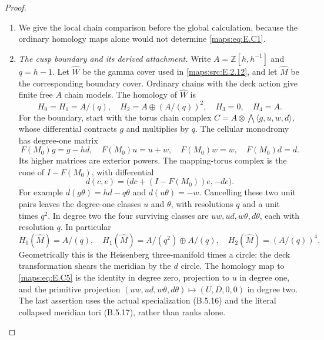 \begin{proof}
\begin{enumerate}[label=\arabic*.,leftmargin=*]
\item We give the local chain comparison before the global
calculation, because the ordinary homology maps alone would
not determine \eqref{maps:eq:E.C1}.

\item \emph{The cusp boundary and its derived attachment.}
Write $A=\mathbb Z[h,h^{-1}]$ and $q=h-1$. Let
$\widehat W$ be the gamma cover used in \ref{maps:src:E.2.12}, and let
$\widehat M$ be the corresponding boundary cover. Ordinary
chains with the deck action give finite free $A$ chain
models. The homology of $\widehat W$ is
\[
 H_0=H_1=A/(q),\quad H_2=A\oplus(A/(q))^2,
 \quad H_3=0,\quad H_4=A.
 \tag{E.C5}\label{maps:eq:E.C5}
\]
For the boundary, start with the torus chain complex
$C= A\otimes\bigwedge\langle g,u,w,d\rangle$,
whose differential contracts $g$ and multiplies by $q$.
The cellular monodromy has degree-one matrix
\[
 F(M_0)g=g-hd,\quad F(M_0)u=u+w,
 \quad F(M_0)w=w,\quad F(M_0)d=d.
 \tag{E.C6}\label{maps:eq:E.C6}
\]
Its higher matrices are exterior powers. The mapping-torus
complex is the cone of $I-F(M_0)$, with differential
\[
 d(c,e)=\big(dc+(I-F(M_0))e,-de\big).
 \tag{E.C7}\label{maps:eq:E.C7}
\]
For example $d(g\theta)=hd-q\theta$ and
$d(u\theta)=-w$. Cancelling these two unit pairs leaves
the degree-one classes $u$ and $\theta$, with resolutions
$q$ and a unit times $q^2$. In degree two the four surviving
classes are $uw,ud,w\theta,d\theta$, each with resolution
$q$. In particular
\[
 H_0(\widehat M)=A/(q),\quad
 H_1(\widehat M)=A/(q^2)\oplus A/(q),\quad
 H_2(\widehat M)=(A/(q))^4.
 \tag{E.C8}\label{maps:eq:E.C8}
\]
Geometrically this is the Heisenberg three-manifold times
a circle: the deck transformation shears the meridian
by the $d$ circle. The homology map to \eqref{maps:eq:E.C5} is the
identity in degree zero, projection to $u$ in degree one,
and the primitive projection
$(uw,ud,w\theta,d\theta)\mapsto(U,D,0,0)$ in degree two.
The last assertion uses the actual specialization
(B.5.16) and the literal collapsed meridian tori
(B.5.17), rather than ranks alone.


\end{enumerate}
\end{proof}
